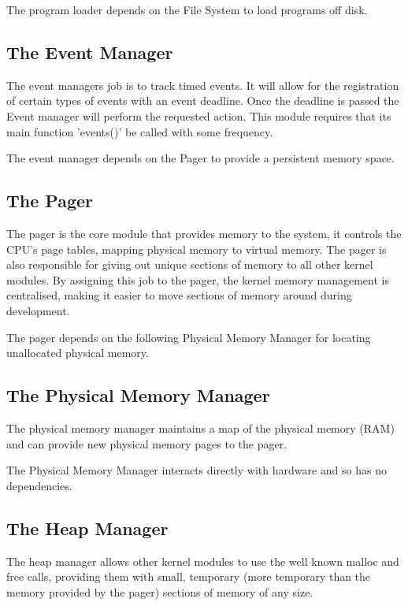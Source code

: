 \documentclass[a4paper]{report}
\begin{document}
The program loader depends on the File System to load programs off disk.

\subsection{The Event Manager}

The event managers job is to track timed events. It will allow for the registration of certain types of events with an event deadline. Once the deadline is passed the Event manager will perform the requested action. This module requires that its main function 'events()' be called with some frequency.

The event manager depends on the Pager to provide a persistent memory space.

\subsection{The Pager}

The pager is the core module that provides memory to the system, it controls the CPU's page tables, mapping physical memory to virtual memory. The pager is also responsible for giving out unique sections of memory to all other kernel modules. By assigning this job to the pager, the kernel memory management is centralised, making it easier to move sections of memory around during development.

The pager depends on the following Physical Memory Manager for locating unallocated physical memory.

\subsection{The Physical Memory Manager}

The physical memory manager maintains a map of the physical memory (RAM) and can provide new physical memory pages to the pager.

The Physical Memory Manager interacts directly with hardware and so has no dependencies.

\subsection{The Heap Manager}

The heap manager allows other kernel modules to use the well known malloc and free calls, providing them with small, temporary (more temporary than the memory provided by the pager) sections of memory of any size.
\end{document}
